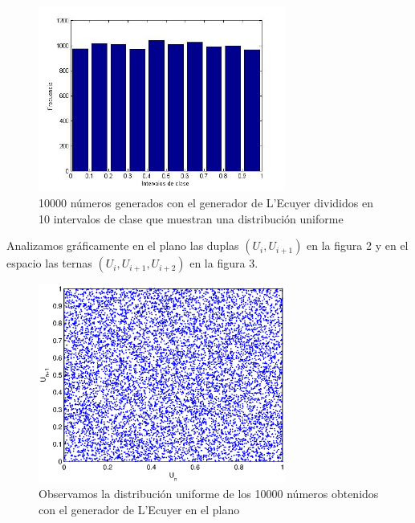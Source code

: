 \documentclass[10pt,journal,compsoc]{IEEEtran}
\begin{document}
\begin{figure}[t]
\label{fig:histogramalecuyer}
\begin{center}
\centering
\includegraphics[width=3.2in]{clases.jpg}
\caption{10000 n\'umeros generados con el generador de L'Ecuyer divididos en 10 intervalos de clase que muestran una distribuci\'on uniforme}
\end{center}
\end{figure}

Analizamos gr\'aficamente en el plano las duplas $(U_i, U_{i+1})$ en la figura 2 y en el espacio las ternas $(U_i, U_{i+1}, U_{i+2})$ en la figura 3.

\begin{figure}[t]
\label{fig:2d}
\begin{center}
\centering
\includegraphics[width=3.2in]{2d_groso.jpg}
\caption{Observamos la distribuci\'on uniforme de los 10000 n\'umeros obtenidos con el generador de L'Ecuyer en el plano}
\end{center}
\end{figure}
\end{document}
